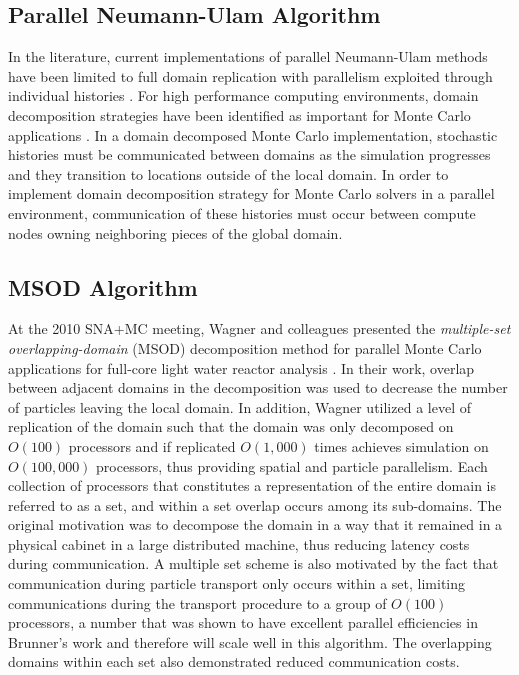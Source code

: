 \documentclass{snamc2013}
\begin{document}
\subsection{Parallel Neumann-Ulam Algorithm}
In the literature, current implementations of parallel Neumann-Ulam
methods have been limited to full domain replication with parallelism
exploited through individual histories
\cite{alexandrov_efficient_1998}. For high performance computing
environments, domain decomposition strategies have been identified as
important for Monte Carlo applications
\cite{brunner_comparison_2006,siegel_analysis_2012}. In a domain
decomposed Monte Carlo implementation, stochastic histories must be
communicated between domains as the simulation progresses and they
transition to locations outside of the local domain. In order to
implement domain decomposition strategy for Monte Carlo solvers in a
parallel environment, communication of these histories must occur
between compute nodes owning neighboring pieces of the global domain.


\subsection{MSOD Algorithm}
At the 2010 SNA+MC meeting, Wagner and colleagues presented the
\textit{multiple-set overlapping-domain} (MSOD) decomposition method
for parallel Monte Carlo applications for full-core light water
reactor analysis \cite{wagner_hybrid_2010}. In their work, overlap
between adjacent domains in the decomposition was used to decrease the
number of particles leaving the local domain. In addition, Wagner
utilized a level of replication of the domain such that the domain was
only decomposed on $O(100)$ processors and if replicated $O(1,000)$
times achieves simulation on $O(100,000)$ processors, thus providing
spatial and particle parallelism. Each collection of processors that
constitutes a representation of the entire domain is referred to as a
set, and within a set overlap occurs among its sub-domains. The
original motivation was to decompose the domain in a way that it
remained in a physical cabinet in a large distributed machine, thus
reducing latency costs during communication. A multiple set scheme is
also motivated by the fact that communication during particle
transport only occurs within a set, limiting communications during the
transport procedure to a group of $O(100)$ processors, a number that
was shown to have excellent parallel efficiencies in Brunner's work
\cite{brunner_efficient_2009} and therefore will scale well in this
algorithm. The overlapping domains within each set also demonstrated
reduced communication costs.
\end{document}
